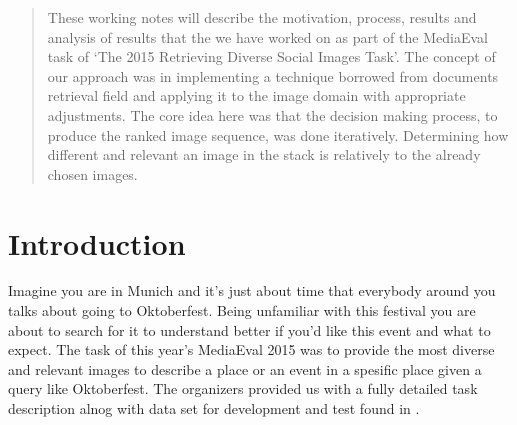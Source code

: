 \documentclass{sig-alternate}
\begin{document}
{\date{20 Agoust 2015}

\maketitle
\begin{abstract}
These working notes will describe the motivation, process, results and 
analysis of results that the we have worked on as part of the 
MediaEval task of `The 2015 Retrieving Diverse Social Images Task'. 
The concept of our approach was in implementing a technique \cite{fscore} borrowed from documents retrieval field 
and applying it to the image domain with appropriate adjustments. 
The core idea here was that the decision making process, to produce the ranked image sequence, 
was done iteratively. Determining how different and relevant an image in 
the stack is relatively to the already chosen images. 

\end{abstract}


\section{Introduction}
Imagine you are in Munich and it's just about time that everybody around you talks about going to 
Oktoberfest. Being unfamiliar with this festival you are about to search for it to understand better if 
you'd like this event and what to expect. The task of this year's MediaEval 2015 was to provide the most
diverse and relevant images to describe a place or an event in a spesific place given a query like Oktoberfest.
The organizers provided us with a fully detailed task description alnog with data set for development and test 
found in \cite{mediaEval2015}.


}
\end{document}
